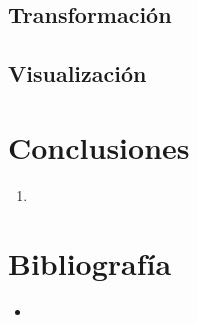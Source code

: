\documentclass[12pt]{article}
\begin{document}
        \subsection{Transformación}
        \subsection{Visualización}


    \newpage
    \section{Conclusiones}
        \begin{enumerate}
            \item 
        \end{enumerate}


    \section{Bibliografía}
        \begin{itemize}
            \item 
        \end{itemize}
\end{document}
